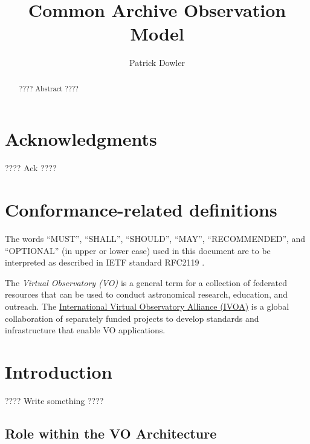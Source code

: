 \documentclass[11pt,a4paper]{ivoa}
\title{Common Archive Observation Model}
\author[https://wiki.ivoa.net/twiki/bin/view/IVOA/PatrickDowler]{Patrick Dowler}
\begin{document}
\begin{abstract}
???? Abstract ????
\end{abstract}


\section*{Acknowledgments}

???? Ack ????

\section*{Conformance-related definitions}

The words ``MUST'', ``SHALL'', ``SHOULD'', ``MAY'', ``RECOMMENDED'', and
``OPTIONAL'' (in upper or lower case) used in this document are to be
interpreted as described in IETF standard RFC2119 \citep{std:RFC2119}.

The \emph{Virtual Observatory (VO)} is a
general term for a collection of federated resources that can be used
to conduct astronomical research, education, and outreach.
The \href{https://www.ivoa.net}{International
Virtual Observatory Alliance (IVOA)} is a global
collaboration of separately funded projects to develop standards and
infrastructure that enable VO applications.


\section{Introduction}

???? Write something ????

\subsection{Role within the VO Architecture}
\end{document}
